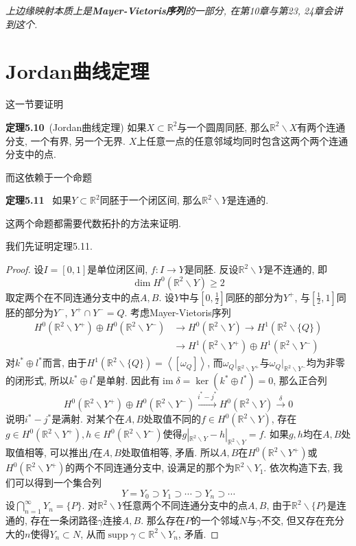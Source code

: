 \documentclass[11pt]{article}
\theoremstyle{definition}\newtheorem*{analyse}{分析}
\theoremstyle{remark}\newtheorem{rem*}{评注}
\newenvironment{env}[1]{\par\vspace{1em}\noindent\textbf{#1}\ }{\par\vspace{1em}}
\DeclareMathOperator{\supp}{supp}
\DeclareMathOperator{\im}{im}
\begin{document}
{\it 上边缘映射本质上是\textbf{Mayer-Vietoris序列}的一部分, 在第10章与第23, 24章会讲到这个.}

\section{Jordan曲线定理}
这一节要证明
\begin{env}{定理5.10}(Jordan曲线定理)
    如果$X\subset\mathbb{R}^2$与一个圆周同胚, 那么$\mathbb{R}^2\backslash X$有两个连通分支, 一个有界, 另一个无界.
    $X$上任意一点的任意邻域均同时包含这两个两个连通分支中的点.
\end{env}
\noindent 而这依赖于一个命题
\begin{env}{定理5.11}
    如果$Y\subset\mathbb{R}^2$同胚于一个闭区间, 那么$\mathbb{R}^2\backslash Y$是连通的.
\end{env}
\noindent 这两个命题都需要代数拓扑的方法来证明.

我们先证明定理5.11.
\begin{proof}
    设$I=[0,1]$是单位闭区间, $f:I\to Y$是同胚.
    反设$\mathbb{R}^2\backslash Y$是不连通的, 即
    \[\dim H^0(\mathbb{R}^2\backslash Y)\geq 2\]
    取定两个在不同连通分支中的点$A,B$.
    设$Y$中与$\left[0,\frac{1}{2}\right]$同胚的部分为$Y^+$, 与$\left[\frac{1}{2},1\right]$同胚的部分为$Y^-$, $Y^+\cap Y^-=Q$.
    考虑Mayer-Vietoris序列
    \begin{align*}
    H^0(\mathbb{R}^2\backslash Y^+)\oplus H^0(\mathbb{R}^2\backslash Y^-)&\longrightarrow H^0(\mathbb{R}^2\backslash Y)
    \longrightarrow H^1(\mathbb{R}^2\backslash\{Q\})\\
    &\longrightarrow H^1(\mathbb{R}^2\backslash Y^+)\oplus H^1(\mathbb{R}^2\backslash Y^-)
    \end{align*}
    对$k^*\oplus l^*$而言, 由于$H^1(\mathbb{R}^2\backslash\{Q\})=\left\langle[\omega_{Q}]\right\rangle$, 而$\omega_{Q}|_{\mathbb{R}^2\backslash Y^+}$与$\omega_{Q}|_{\mathbb{R}^2\backslash Y^-}$均为非零的闭形式, 所以$k^*\oplus l^*$是单射.
    因此有$\im\delta=\ker(k^*\oplus l^*)=0$, 那么正合列
    \[H^0(\mathbb{R}^2\backslash Y^+)\oplus H^0(\mathbb{R}^2\backslash Y^-)\xrightarrow{i^*-j^*} H^0(\mathbb{R}^2\backslash Y)\xrightarrow{\delta}0\]
    说明$i^*-j^*$是满射. 对某个在$A,B$处取值不同的$f\in H^0(\mathbb{R}^2\backslash Y)$, 存在$g\in H^0(\mathbb{R}^2\backslash Y^+),h\in H^0(\mathbb{R}^2\backslash Y^-)$使得$g|_{\mathbb{R}^2\backslash Y}-h|_{\mathbb{R}^2\backslash Y}=f$.
    如果$g,h$均在$A,B$处取值相等, 可以推出$f$在$A,B$处取值相等, 矛盾.
    所以$A,B$在$H^0(\mathbb{R}^2\backslash Y^+)$或$H^0(\mathbb{R}^2\backslash Y^+)$的两个不同连通分支中, 设满足的那个为$\mathbb{R}^2\backslash Y_1$.
    依次构造下去, 我们可以得到一个集合列
    \[Y=Y_0\supset Y_1\supset\cdots\supset Y_n\supset\cdots\]
    设$\bigcap_{n=1}^\infty Y_n=\{P\}$.
    对$\mathbb{R}^2\backslash Y$任意两个不同连通分支中的点$A,B$, 由于$\mathbb{R}^2\backslash\{P\}$是连通的, 存在一条闭路径$\gamma$连接$A,B$.
    那么存在$P$的一个邻域$N$与$\gamma$不交, 但又存在充分大的$n$使得$Y_n\subset N$, 从而$\supp\gamma\subset\mathbb{R}^2\backslash Y_n$, 矛盾.
\end{proof}
\end{document}
